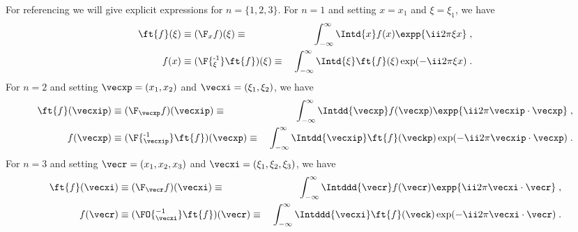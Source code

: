 \documentclass[
twoside,
openright,
titlepage,
numbers=noenddot,
headinclude,
fleqn,
a4paper,
footinclude=true,
cleardoublepage=empty,
abstractoff,
BCOR=5mm,
paper=a4,
fontsize=11pt,
british,ngerman,american,
]{scrreprt}
\begin{document}
For referencing we will give explicit expressions for $n=\{1,2,3\}$.
For $n=1$ and setting $x=x_1$ and $\xi=\xi_1$, we have
\begin{equation}
  \label{eq:ft-xi-1}
  \begin{split}
    \ft{f}(\xi) &\equiv (\F_x f)(\xi) 
    \equiv{}& \int_{-\infty}^\infty \Intd{x} 
    f(x) \expp{\ii 2\pi \xi x} \;,
    \\ f(x) &\equiv (\F{^{\operatorname{-1}}_\xi} \ft{f})(\xi) \equiv{}&
    \int_{-\infty}^\infty \Intd{\xi} 
    \ft{f}(\xi) \exp(-\ii 2\pi\xi x) \;.
  \end{split}
\end{equation}
For $n=2$ and setting $\vecxp=(x_1,x_2)$ and $\vecxi=(\xi_1,\xi_2)$,
we have
\begin{equation}
  \label{eq:ft-xi-2}
  \begin{split}
    \ft{f}(\vecxip) &\equiv (\F_{\vecxp} f)(\vecxip) 
    \equiv{}&\int_{-\infty}^\infty \Intdd{\vecxp} 
  f(\vecxp) \expp{\ii 2\pi\vecxip\cdot\vecxp} \;,
  \\   f(\vecxp) &\equiv (\F{^{\operatorname{-1}}_{\vecxip}} \ft{f})(\vecxp)
  \equiv{}& \int_{-\infty}^\infty \Intdd{\vecxip} 
  \ft{f}(\veckp) \exp(-\ii2\pi\vecxip\cdot\vecxp) \;.
  \end{split}
\end{equation}
For $n=3$ and setting $\vecr=(x_1,x_2,x_3)$ and
$\vecxi=(\xi_1,\xi_2,\xi_3)$, we have
\begin{equation}
  \label{eq:ft-xi-3}
  \begin{split}
    \ft{f}(\vecxi) &\equiv (\F_\vecr f)(\vecxi) \equiv{}&
    \int_{-\infty}^\infty\Intddd{\vecr}
    f(\vecr)\expp{\ii 2\pi\vecxi\cdot\vecr} \;,
    \\ f(\vecr) &\equiv (\FO{^{-1}_\vecxi} \ft{f})(\vecr) \equiv{}&
    \int_{-\infty}^\infty \Intddd{\vecxi} 
    \ft{f}(\veck) \exp(-\ii 2\pi\vecxi\cdot\vecr) \;.
  \end{split}
\end{equation}

\cleardoublepage

\begingroup 
\let\clearpage\relax
\let\cleardoublepage\relax
\let\cleardoublepage\relax
    \manualmark
    \markboth{\spacedlowsmallcaps{\listfigurename}}
    {\spacedlowsmallcaps{\listfigurename}}
\end{document}
